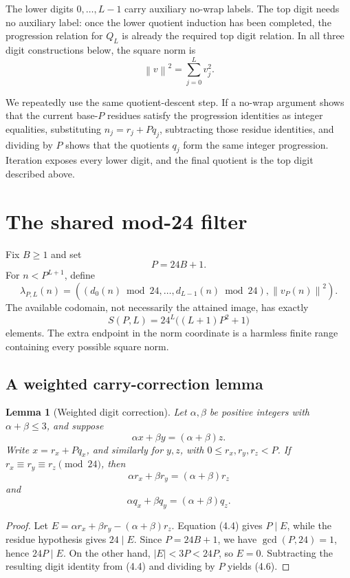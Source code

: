 \documentclass[11pt]{article}
\newtheorem{lemma}[theorem]{Lemma}
\theoremstyle{definition}
\newcommand{\norm}[1]{\left\lVert #1\right\rVert}
\begin{document}
The lower digits \(0,\ldots,L-1\) carry auxiliary no-wrap labels.  The top
digit needs no auxiliary label: once the lower quotient induction has been
completed, the progression relation for \(Q_L\) is already the required top
digit relation.  In all three digit constructions below, the square norm is
\[
 \norm{v}^2=\sum_{j=0}^L v_j^2.
 \tag{3.3}
\]

We repeatedly use the same quotient-descent step.  If a no-wrap argument
shows that the current base-\(P\) residues satisfy the progression identities
as integer equalities, substituting \(n_j=r_j+Pq_j\), subtracting those residue
identities, and dividing by \(P\) shows that the quotients \(q_j\) form the
same integer progression.  Iteration exposes every lower digit, and the final
quotient is the top digit described above.

\section{The shared mod-24 filter}

Fix \(B\geq1\) and set
\[
 P=24B+1.
 \tag{4.1}
\]
For \(n<P^{L+1}\), define
\[
 \lambda_{P,L}(n)=
 \left(
   (d_0(n)\bmod24,\ldots,d_{L-1}(n)\bmod24),
   \norm{v_P(n)}^2
 \right).
 \tag{4.2}
\]
The available codomain, not necessarily the attained image, has exactly
\[
 S(P,L)=24^L\bigl((L+1)P^2+1\bigr)
 \tag{4.3}
\]
elements.  The extra endpoint in the norm coordinate is a harmless finite
range containing every possible square norm.

\subsection{A weighted carry-correction lemma}

\begin{lemma}[Weighted digit correction]\label{lem:weighted-carry}
Let \(\alpha,\beta\) be positive integers with
\(\alpha+\beta\leq3\), and suppose
\[
 \alpha x+\beta y=(\alpha+\beta)z.
 \tag{4.4}
\]
Write \(x=r_x+Pq_x\), and similarly for \(y,z\), with
\(0\leq r_x,r_y,r_z<P\).  If
\(r_x\equiv r_y\equiv r_z\pmod {24}\), then
\[
 \alpha r_x+\beta r_y=(\alpha+\beta)r_z
 \tag{4.5}
\]
and
\[
 \alpha q_x+\beta q_y=(\alpha+\beta)q_z.
 \tag{4.6}
\]
\end{lemma}

\begin{proof}
Let
\(E=\alpha r_x+\beta r_y-(\alpha+\beta)r_z\).
Equation (4.4) gives \(P\mid E\), while the residue hypothesis gives
\(24\mid E\).  Since \(P=24B+1\), we have \(\gcd(P,24)=1\), hence
\(24P\mid E\).  On the other hand,
\(\lvert E\rvert<3P<24P\), so \(E=0\).  Subtracting the resulting digit
identity from (4.4) and dividing by \(P\) yields (4.6).
\end{proof}
\end{document}
